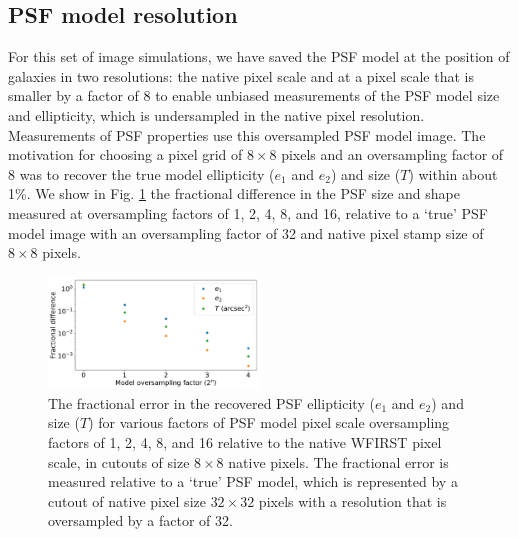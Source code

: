 \documentclass[aps,prd, amsmath,amssymb,superscriptaddress,showkeys,nofootinbib,reprint,preprintnumbers]{revtex4-1}
\begin{document}
\begin{widetext}
\section{PSF model resolution}
\label{app:psf_resol}

For this set of image simulations, we have saved the PSF model at the position of galaxies in two resolutions: the native pixel scale and at a pixel scale that is smaller by a factor of 8 to enable unbiased measurements of the PSF model size and ellipticity, which is undersampled in the native pixel resolution. Measurements of PSF properties use this oversampled PSF model image. The motivation for choosing a pixel grid of $8\times8$ pixels and an oversampling factor of 8 was to recover the true model ellipticity ($e_1$ and $e_2$) and size ($T$) within about 1\%. We show in Fig. \ref{fig:psf_oversampling} the fractional difference in the PSF size and shape measured at oversampling factors of 1, 2, 4, 8, and 16, relative to a `true' PSF model image with an oversampling factor of 32 and native pixel stamp size of $8\times 8$ pixels.
 
\begin{figure}
\begin{center}
\includegraphics[width=0.5\textwidth]{figures/psf_oversampling.pdf}
\end{center}
\caption[]{
The fractional error in the recovered PSF ellipticity ($e_1$ and $e_2$) and size ($T$) for various factors of PSF model pixel scale oversampling factors of 1, 2, 4, 8, and 16 relative to the native WFIRST pixel scale, in cutouts of size $8\times 8$ native pixels. The fractional error is measured relative to a `true' PSF model, which is represented by a cutout of native pixel size $32\times32$ pixels with a resolution that is oversampled by a factor of 32.
\label{fig:psf_oversampling}}
\end{figure}

\end{widetext}




\label{lastpage}
\end{document}
